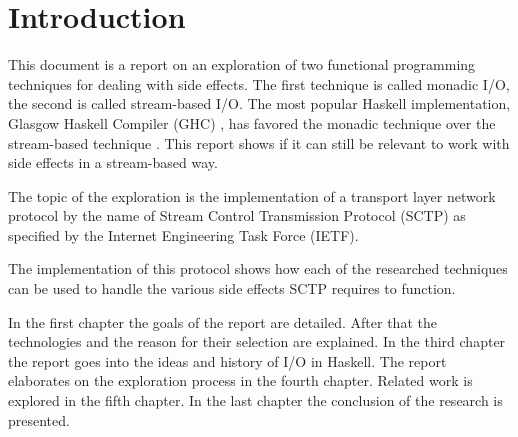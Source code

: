 \chapter*{Introduction}
This document is a report on an exploration of two functional programming techniques for dealing with side effects.
The first technique is called monadic I/O, the second is called stream-based I/O.
The most popular Haskell implementation, Glasgow Haskell Compiler (GHC) \cite{haskell_implementations}, has favored the monadic technique over the stream-based technique \cite{hudak_history_2007}.
This report shows if it can still be relevant to work with side effects in a stream-based way. 

The topic of the exploration is the implementation of a transport layer network protocol by the name of Stream Control Transmission Protocol (SCTP) as specified by the Internet Engineering Task Force (IETF).

The implementation of this protocol shows how each of the researched techniques can be used to handle the various side effects SCTP requires to function. 

In the first chapter the goals of the report are detailed. After that the technologies and the reason for their selection are explained. In the third chapter the report goes into the ideas and history of I/O in Haskell.
The report elaborates on the exploration process in the fourth chapter. Related work is explored in the fifth chapter.
In the last chapter the conclusion of the research is presented.
